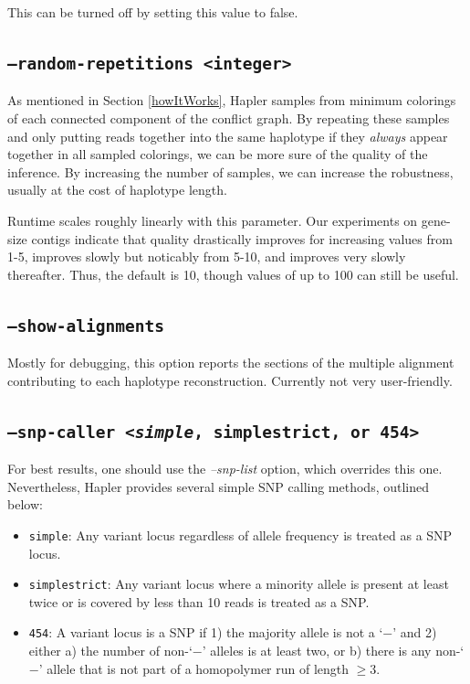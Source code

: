 \documentclass[11pt]{llncs}
\begin{document}
This can be turned off by setting this value to false.

\subsection{\texttt{--random-repetitions <integer>}}

As mentioned in Section \ref{howItWorks}, Hapler samples from minimum colorings of each connected component of the conflict graph.
By repeating these samples and only putting reads together into the same haplotype if they \emph{always} appear together in all
sampled colorings, we can be more sure of the quality of the inference. By increasing the number of samples, we can increase the robustness,
usually at the cost of haplotype length.

Runtime scales roughly linearly with this parameter. Our experiments on gene-size contigs indicate that quality drastically improves for increasing
values from 1-5, improves slowly but noticably from 5-10, and improves very slowly thereafter. Thus, the default is 10, though values of up to 100 
can still be useful.


\subsection{\texttt{--show-alignments}}

Mostly for debugging, this option reports the sections of the multiple alignment contributing to each haplotype reconstruction. Currently
not very user-friendly.

\subsection{\texttt{--snp-caller <\textit{simple}, simplestrict, or 454>}}

For best results, one should use the \emph{--snp-list} option, which overrides this one. Nevertheless, Hapler provides several simple SNP 
calling methods, outlined below:

\begin{itemize}
	\item \texttt{simple}: Any variant locus regardless of allele frequency is treated as a SNP locus.
	\item \texttt{simplestrict}: Any variant locus where a minority allele is present at least twice or is covered by less than 10 reads is treated as a SNP.
	\item \texttt{454}: A variant locus is a SNP if 1) the majority allele is not a `$-$'
	and 2) either a) the number of non-`$-$' alleles is at least two, or
	b) there is any non-`$-$' allele that is not part of a homopolymer run
	of length $\geq 3$.
\end{itemize}
\end{document}
